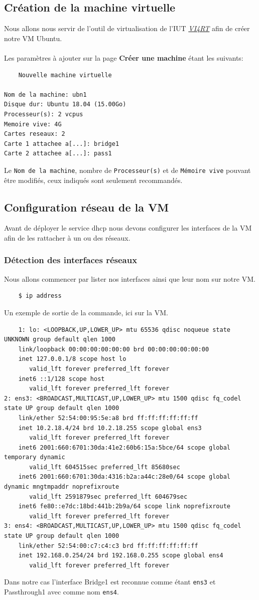 \documentclass[a4paper]{article}
\begin{document}
\subsection{Création de la machine virtuelle}
Nous allons nous servir de l'outil de virtualisation de l'IUT \href{http://vi4rt.univ-pau.fr}{\textit{VI4RT}} afin de créer notre VM Ubuntu.
\\\\Les paramètres à ajouter sur la page \textbf{Créer une machine} étant les suivants:
\begin{lstlisting}
    Nouvelle machine virtuelle

Nom de la machine: ubn1
Disque dur: Ubuntu 18.04 (15.00Go)
Processeur(s): 2 vcpus
Memoire vive: 4G
Cartes reseaux: 2
Carte 1 attachee a[...]: bridge1
Carte 2 attachee a[...]: pass1
\end{lstlisting}
Le \verb|Nom de la machine|, nombre de \verb|Processeur(s)| et de \verb|Mémoire vive| pouvant être modifiés, ceux indiqués sont seulement recommandés.
\subsection{Configuration réseau de la VM}
Avant de déployer le service dhcp nous devons configurer les interfaces de la VM afin de les rattacher à un ou des réseaux.
\subsubsection{Détection des interfaces réseaux}
\label{sec:secip}
\label{sec:sec02}
Nous allons commencer par lister nos interfaces ainsi que leur nom sur notre VM.\\
\begin{lstlisting}
    $ ip address
\end{lstlisting}
Un exemple de sortie de la commande, ici sur la VM.
\begin{lstlisting}    
    1: lo: <LOOPBACK,UP,LOWER_UP> mtu 65536 qdisc noqueue state UNKNOWN group default qlen 1000
    link/loopback 00:00:00:00:00:00 brd 00:00:00:00:00:00
    inet 127.0.0.1/8 scope host lo
       valid_lft forever preferred_lft forever
    inet6 ::1/128 scope host 
       valid_lft forever preferred_lft forever
2: ens3: <BROADCAST,MULTICAST,UP,LOWER_UP> mtu 1500 qdisc fq_codel state UP group default qlen 1000
    link/ether 52:54:00:95:5e:a8 brd ff:ff:ff:ff:ff:ff
    inet 10.2.18.4/24 brd 10.2.18.255 scope global ens3
       valid_lft forever preferred_lft forever
    inet6 2001:660:6701:30da:41e2:60b6:15a:5bce/64 scope global temporary dynamic 
       valid_lft 604515sec preferred_lft 85680sec
    inet6 2001:660:6701:30da:4316:b2a:a44c:28e0/64 scope global dynamic mngtmpaddr noprefixroute 
       valid_lft 2591879sec preferred_lft 604679sec
    inet6 fe80::e7dc:18bd:441b:2b9a/64 scope link noprefixroute 
       valid_lft forever preferred_lft forever
3: ens4: <BROADCAST,MULTICAST,UP,LOWER_UP> mtu 1500 qdisc fq_codel state UP group default qlen 1000
    link/ether 52:54:00:c7:c4:c3 brd ff:ff:ff:ff:ff:ff
    inet 192.168.0.254/24 brd 192.168.0.255 scope global ens4
       valid_lft forever preferred_lft forever
\end{lstlisting}
Dans notre cas l'interface Bridge1 est reconnue comme étant \verb|ens3| et Passthrough1 avec comme nom \verb|ens4|.
\end{document}
